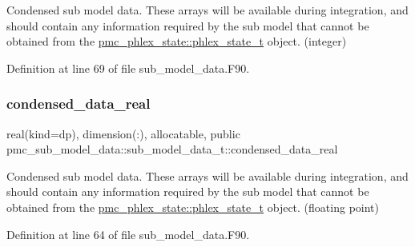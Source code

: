 Condensed sub model data. These arrays will be available during integration, and should contain any information required by the sub model that cannot be obtained from the \mbox{\hyperlink{structpmc__phlex__state_1_1phlex__state__t}{pmc\+\_\+phlex\+\_\+state\+::phlex\+\_\+state\+\_\+t}} object. (integer) 



Definition at line 69 of file sub\+\_\+model\+\_\+data.\+F90.

\mbox{\label{structpmc__sub__model__data_1_1sub__model__data__t_afd5cb983e75931ea32d69ec1094890eb}} 
\subsubsection{\texorpdfstring{condensed\+\_\+data\+\_\+real}{condensed\_data\_real}}
{\footnotesize\ttfamily real(kind=dp), dimension(\+:), allocatable, public pmc\+\_\+sub\+\_\+model\+\_\+data\+::sub\+\_\+model\+\_\+data\+\_\+t\+::condensed\+\_\+data\+\_\+real}



Condensed sub model data. These arrays will be available during integration, and should contain any information required by the sub model that cannot be obtained from the \mbox{\hyperlink{structpmc__phlex__state_1_1phlex__state__t}{pmc\+\_\+phlex\+\_\+state\+::phlex\+\_\+state\+\_\+t}} object. (floating point) 



Definition at line 64 of file sub\+\_\+model\+\_\+data.\+F90.

\mbox{\label{structpmc__sub__model__data_1_1sub__model__data__t_a93d525020dba241f6c410e023716c5b3}} 
